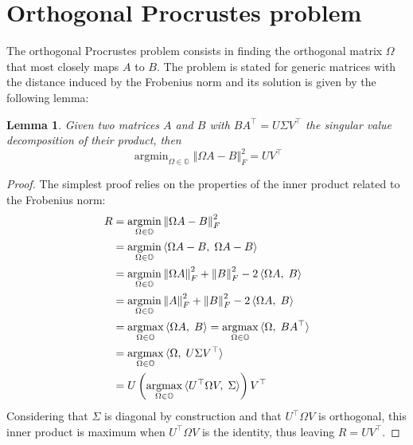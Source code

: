 \documentclass[fleqn]{article}
\theoremstyle{theorem}
\newtheorem{lemma}{Lemma}[section]
\theoremstyle{definition}
\DeclareMathOperator*{\argmin}{argmin}
\DeclareMathOperator*{\argmax}{argmax}
\newcommand{\norm}[2][]{\left\Vert#2\right\Vert_{#1}}
\begin{document}
    \section{Orthogonal Procrustes problem}
    The orthogonal Procrustes problem consists in finding the orthogonal matrix $\Omega$ that most closely maps $A$ to $B$. The problem is stated for generic matrices with the distance induced by the Frobenius norm and its solution is given by the following lemma:
    \begin{lemma}\label{thm:procr}
        Given two matrices $A$ and $B$ with $BA^\top\! = U\Sigma V^\top$ the singular value decomposition of their product, then
        \begin{equation}\label{eq:procr}
            \argmin_{\Omega\in\mathbb{O}}\norm[F]{\Omega A - B}^2 = UV^\top
        \end{equation}
    \end{lemma}
    \begin{proof}
        The simplest proof relies on the properties of the inner product related to the Frobenius norm:
        \begin{align*}
            R 	&= \argmin_{\Omega\in\mathbb{O}}\norm[F]{\Omega A - B}^2\\
            &= \argmin_{\Omega\in\mathbb{O}}\braket{\Omega A - B,\; \Omega A - B}\\
            &= \argmin_{\Omega\in\mathbb{O}}\norm[F]{\Omega A}^2 + \norm[F]{B}^2 - 2\braket{\Omega A,\; B}\\
            &= \argmin_{\Omega\in\mathbb{O}}\norm[F]{A}^2 + \norm[F]{B}^2 - 2\braket{\Omega A,\; B}\\
            &= \argmax_{\Omega\in\mathbb{O}}\braket{\Omega A,\; B} = \argmax_{\Omega\in\mathbb{O}}\braket{\Omega,\;  BA^\top} \\
            &= \argmax_{\Omega\in\mathbb{O}}\braket{\Omega,\; U\Sigma V^\top}\\
            &= U\left(\argmax_{\Omega\in\mathbb{O}}\braket{U^\top\Omega V,\; \Sigma}\right)V^\top
        \end{align*}
        Considering that $\Sigma$ is diagonal by construction and that $U^\top\Omega V$ is orthogonal, this inner product is maximum \cite{gower_procrustes_2004} when $U^\top\Omega V$ is the identity, thus leaving $R = UV^\top$.
    \end{proof}
\end{document}
